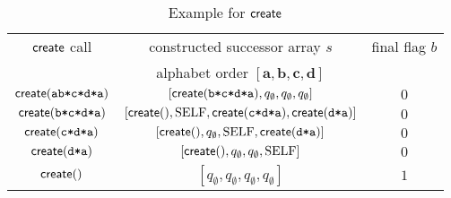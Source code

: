%


\begin{table}
\centering
\caption{Example for $\operatorname{\textsf{create}}$}\label{tab:create}
\begin{tabular}[t]{ccc}
\toprule
$\operatorname{\textsf{create}}$ call & constructed successor array $s$ & final flag $b$ \\  & alphabet order $[\bm{a},\bm{b},\bm{c},\bm{d}]$ & \\
\midrule
$\operatorname{\textsf{create}}(\texttt{ab*c*d*a})$&$[\operatorname{\textsf{create}}(\texttt{b*c*d*a}),q_{\emptyset},q_{\emptyset}, q_{\emptyset}]$&$0$\\
$\operatorname{\textsf{create}}(\texttt{b*c*d*a})$&$[\operatorname{\textsf{create}}(),\mathrm{SELF},\operatorname{\textsf{create}}(\texttt{c*d*a}), \operatorname{\textsf{create}}(\texttt{d*a})]$&$0$\\
$\operatorname{\textsf{create}}(\texttt{c*d*a})$&$[\operatorname{\textsf{create}}(),q_{\emptyset},\mathrm{SELF}, \operatorname{\textsf{create}}(\texttt{d*a})]$&$0$\\
$\operatorname{\textsf{create}}(\texttt{d*a})$&$[\operatorname{\textsf{create}}(),q_{\emptyset},q_{\emptyset}, \mathrm{SELF}]$&$0$\\
$\operatorname{\textsf{create}}()$&$[q_{\emptyset},q_{\emptyset},q_{\emptyset},q_{\emptyset}]$&$1$\\
\bottomrule
\end{tabular}
\end{table}



